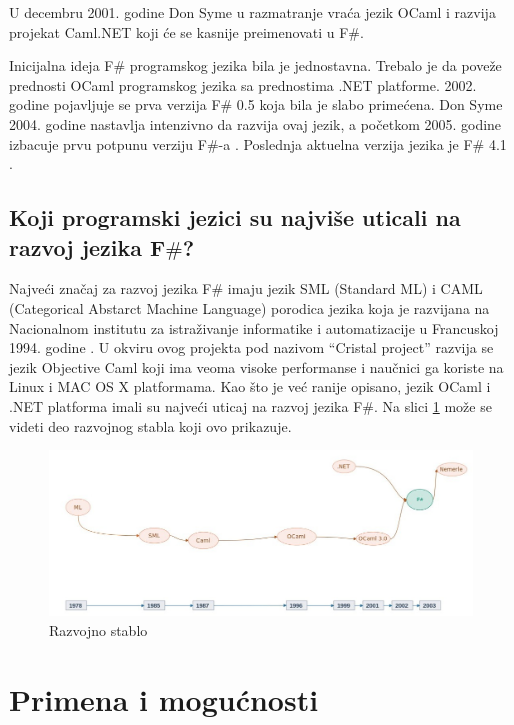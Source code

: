 \documentclass[a4paper]{article}
\begin{document}
U decembru 2001. godine Don Syme u razmatranje vraća jezik OCaml i razvija projekat Caml.NET koji će se kasnije preimenovati u F\#.

Inicijalna ideja F\# programskog jezika bila je jednostavna. Trebalo je da poveže prednosti OCaml programskog jezika sa prednostima .NET platforme. 2002. godine pojavljuje se prva verzija F\# 0.5 koja bila je slabo primećena. Don Syme 2004. godine nastavlja intenzivno da razvija ovaj jezik, a početkom 2005. godine izbacuje prvu potpunu verziju F\#-a \cite{early_history}.
Poslednja aktuelna verzija jezika je F\# 4.1 \cite{fsharp}.

\subsection{Koji programski jezici su najviše uticali na razvoj jezika F$\#$?}
\label{subsec:uticaj}

Najveći značaj za razvoj jezika F\# imaju jezik SML (Standard ML) i CAML (Categorical Abstarct Machine Language) porodica jezika koja je razvijana na Nacionalnom institutu za istraživanje informatike i automatizacije u Francuskoj 1994. godine \cite{Harrop:2008:FS:1481410}. U okviru ovog projekta pod nazivom “Cristal project” razvija se jezik Objective Caml koji ima veoma visoke performanse i naučnici ga koriste na Linux i MAC OS X platformama. Kao što je već ranije opisano, jezik OCaml i .NET platforma imali su najveći uticaj na razvoj jezika F\#. Na slici \ref{fig:stablo} može se videti deo razvojnog stabla koji ovo prikazuje.

\begin{figure}[h!]
\begin{center}
\includegraphics[scale=0.29]{stablo.jpg}
\end{center}
\caption{Razvojno stablo}
\label{fig:stablo}
\end{figure}


\section{Primena i mogućnosti}
\label{sec:primena}
\end{document}
